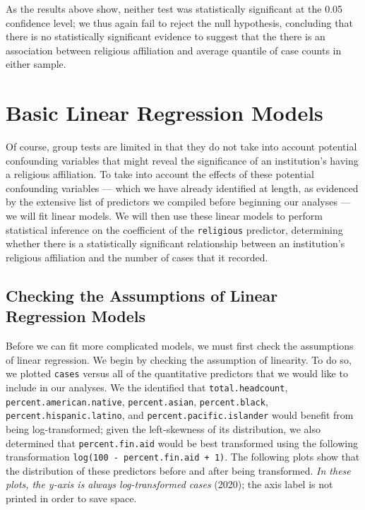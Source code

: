 \documentclass[
]{article}
\begin{document}
As the results above show, neither test was statistically significant at
the 0.05 confidence level; we thus again fail to reject the null
hypothesis, concluding that there is no statistically significant
evidence to suggest that the there is an association between religious
affiliation and average quantile of case counts in either sample.

\hypertarget{basic-linear-regression-models}{%
\section{Basic Linear Regression
Models}\label{basic-linear-regression-models}}

Of course, group tests are limited in that they do not take into account
potential confounding variables that might reveal the significance of an
institution's having a religious affiliation. To take into account the
effects of these potential confounding variables --- which we have
already identified at length, as evidenced by the extensive list of
predictors we compiled before beginning our analyses --- we will fit
linear models. We will then use these linear models to perform
statistical inference on the coefficient of the \texttt{religious}
predictor, determining whether there is a statistically significant
relationship between an institution's religious affiliation and the
number of cases that it recorded.

\hypertarget{checking-the-assumptions-of-linear-regression-models}{%
\subsection{Checking the Assumptions of Linear Regression
Models}\label{checking-the-assumptions-of-linear-regression-models}}

Before we can fit more complicated models, we must first check the
assumptions of linear regression. We begin by checking the assumption of
linearity. To do so, we plotted \texttt{cases} versus all of the
quantitative predictors that we would like to include in our analyses.
We the identified that \texttt{total.headcount},
\texttt{percent.american.native}, \texttt{percent.asian},
\texttt{percent.black}, \texttt{percent.hispanic.latino}, and
\texttt{percent.pacific.islander} would benefit from being
log-transformed; given the left-skewness of its distribution, we also
determined that \texttt{percent.fin.aid} would be best transformed using
the following transformation
\texttt{log(100\ -\ percent.fin.aid\ +\ 1)}. The following plots show
that the distribution of these predictors before and after being
transformed. \emph{In these plots, the y-axis is always log-transformed
cases} (2020); the axis label is not printed in order to save space.
\end{document}
